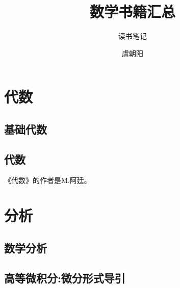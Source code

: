 \documentclass[cn,11pt,chinese]{elegantbook}
\title{数学书籍汇总}
\subtitle{读书笔记}
\author{虞朝阳}
\institute{西北工业大学}
\begin{document}
\maketitle



\tableofcontents
\mainmatter
\hypersetup{pageanchor=true}

\part{代数}



\chapter{基础代数}


\chapter{代数}
 《代数》的作者是M.阿廷。

\part{分析}
\chapter{数学分析}


\chapter{高等微积分:微分形式导引}



% 

\appendix
\end{document}
